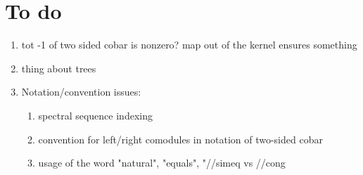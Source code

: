 \newpage
\section{To do}
\begin{enumerate}
    \item tot -1 of two sided cobar is nonzero? map out of the kernel ensures something
    \item thing about trees 
    \item Notation/convention issues:
    \begin{enumerate}
        \item spectral sequence indexing 
        \item convention for left/right comodules in notation of two-sided cobar
        \item usage of the word "natural", "equals", "//simeq vs //cong
    \end{enumerate}
\end{enumerate}